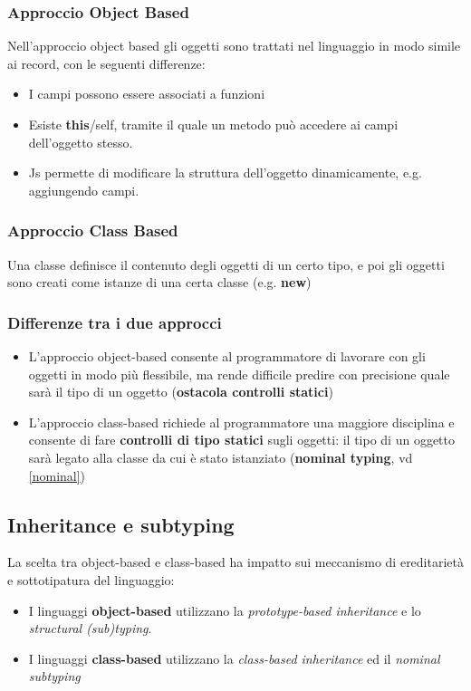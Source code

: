\documentclass[a4paper,10pt]{article}
\begin{document}
\subsubsection{Approccio Object Based}
Nell'approccio object based gli oggetti sono trattati nel linguaggio in modo simile ai record, con le seguenti differenze:
\begin{itemize}
 \item I campi possono essere associati a funzioni
 \item Esiste \textbf{this}/self, tramite il quale un metodo può accedere ai campi dell'oggetto stesso.
 \item Js permette di modificare la struttura dell'oggetto dinamicamente, e.g. aggiungendo campi.
\end{itemize}

\subsubsection{Approccio Class Based}

Una classe definisce il contenuto degli oggetti di un certo tipo, e poi gli oggetti sono creati come istanze di una certa classe (e.g. \textbf{new})

\subsubsection{Differenze tra i due approcci}

\begin{itemize}
 \item L'approccio object-based consente al programmatore di lavorare con gli oggetti in modo più flessibile, ma rende difficile predire con precisione quale sarà il tipo di un oggetto (\textbf{ostacola controlli statici})
 \item L'approccio class-based richiede al programmatore una maggiore disciplina e consente di fare \textbf{controlli di tipo statici} sugli oggetti: il tipo di un oggetto sarà legato alla classe da cui è stato istanziato (\textbf{nominal typing}, vd \ref{nominal}) 
\end{itemize}
\newpage
\subsection{Inheritance e subtyping}
La scelta tra object-based e class-based ha impatto sui meccanismo di ereditarietà e sottotipatura del linguaggio:
\begin{itemize}
 \item I linguaggi \textbf{object-based} utilizzano la \emph{prototype-based inheritance} e lo \emph{structural (sub)typing}.
 \item I linguaggi \textbf{class-based} utilizzano la \emph{class-based inheritance} ed il \emph{nominal subtyping}
\end{itemize}
\end{document}
